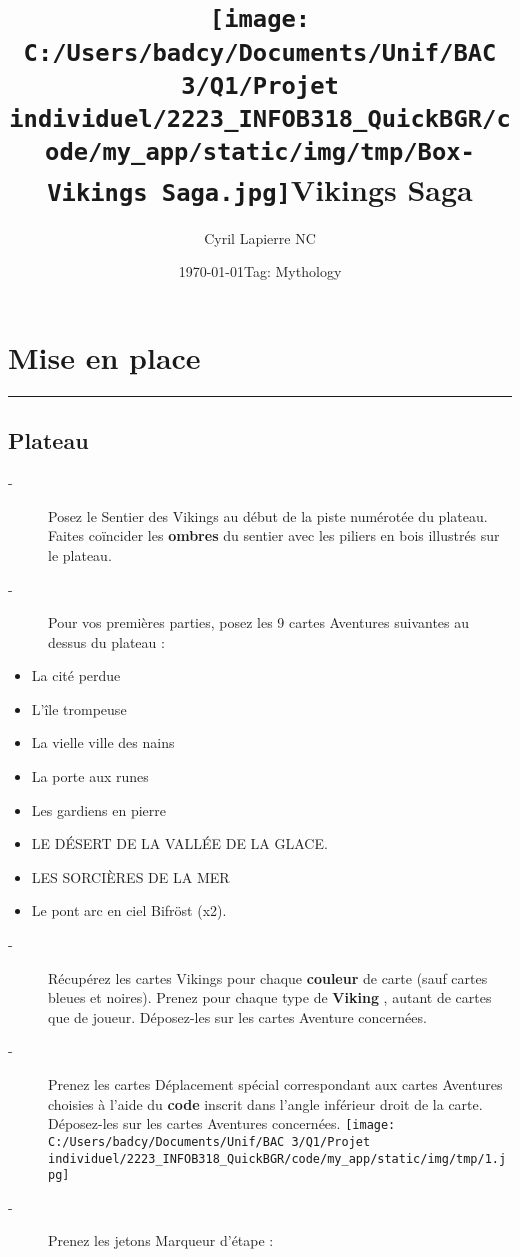 \documentclass{scrartcl}%
\title{\texttt{[image: C:/Users/badcy/Documents/Unif/BAC 3/Q1/Projet individuel/2223\_INFOB318\_QuickBGR/code/my\_app/static/img/tmp/Box-Vikings Saga.jpg]}\break Vikings Saga }%
\author{Cyril Lapierre NC}%
\date{\today \break Tag: Mythology}%
\begin{document}
%
\normalsize%
\maketitle\thispagestyle{header}%
\pagestyle{header}%
\section{ Mise en place
}%
\label{sec:Miseenplace}%
\rule{18cm}{0.07cm}\break

%
\subsection{ Plateau
}%
\label{subsec:Plateau}%
\begin{description}%
\item[{-} ]%
%
 Posez le Sentier des Vikings au début de la piste numérotée du plateau. Faites coïncider les %
\textbf{ombres}%
\textit{ }%
 du sentier avec les piliers en bois illustrés sur le plateau.
%
\item[{-} ]%
%
 Pour vos premières parties, posez les 9 cartes Aventures suivantes au dessus du plateau :
%
\end{description}%
\begin{itemize}%
\item%
%
 La cité perdue 
%
\item%
%
 L’île trompeuse 
%
\item%
%
 La vielle ville des nains 
%
\item%
%
 La porte aux runes 
%
\item%
%
 Les gardiens en pierre 
%
\item%
%
 LE DÉSERT DE LA VALLÉE DE LA GLACE.
%
\item%
%
 LES SORCIÈRES DE LA MER 
%
\item%
%
 Le pont arc en ciel Bifröst (x2).
%
\end{itemize}%
\begin{description}%
\item[{-} ]%
%
 Récupérez les cartes Vikings pour chaque %
\textbf{couleur}%
\textit{ }%
 de carte (sauf cartes bleues et noires). Prenez pour chaque type de %
\textbf{Viking}%
, autant de cartes que de joueur. Déposez{-}les sur les cartes Aventure concernées.
%
\item[{-} ]%
%
 Prenez les cartes Déplacement spécial correspondant aux cartes Aventures choisies à l'aide du %
\textbf{code}%
\textit{ }%
 inscrit dans l'angle inférieur droit de la carte. Déposez{-}les sur les cartes Aventures concernées.%
\texttt{[image: C:/Users/badcy/Documents/Unif/BAC 3/Q1/Projet individuel/2223\_INFOB318\_QuickBGR/code/my\_app/static/img/tmp/1.jpg]}%

%
\item[{-} ]%
%
 Prenez les jetons Marqueur d'étape :
%
\end{description}%
\end{document}
